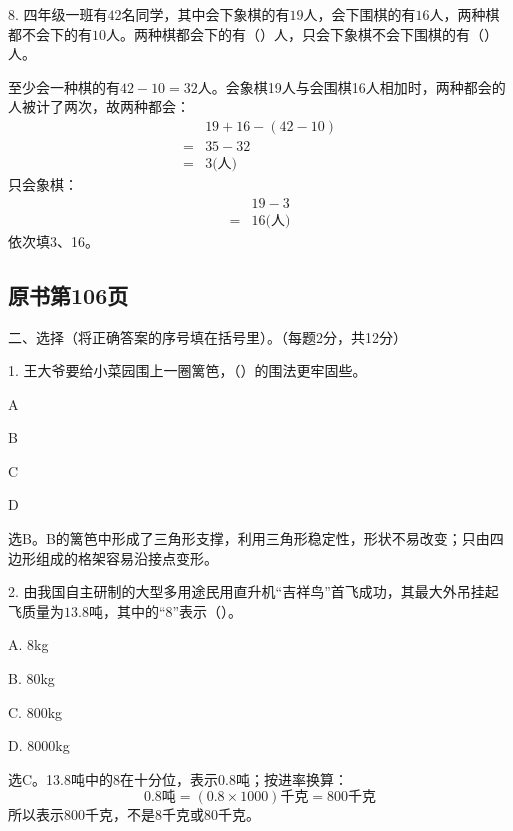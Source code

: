 8. 四年级一班有\(42\)名同学，其中会下象棋的有\(19\)人，会下围棋的有\(16\)人，两种棋都不会下的有\(10\)人。两种棋都会下的有（\hspace{1.8em}）人，只会下象棋不会下围棋的有（\hspace{1.8em}）人。\par
\begin{BookAnswer}
至少会一种棋的有\(42-10=32\)人。会象棋19人与会围棋16人相加时，两种都会的人被计了两次，故两种都会：\[\begin{aligned} &19+16-(42-10)\\ ={}&35-32\\ ={}&3\text{(人)}\end{aligned}\]只会象棋：\[\begin{aligned} &19-3\\ ={}&16\text{(人)}\end{aligned}\]依次填3、16。
\end{BookAnswer}



\subsection*{原书第106页}

二、选择（将正确答案的序号填在括号里）。（每题2分，共12分）\par 1. 王大爷要给小菜园围上一圈篱笆，（\hspace{1.8em}）的围法更牢固些。\par
\noindent A\par
\noindent B\par
\noindent C\par
\noindent D\par
{}
\begin{BookAnswer}
选B。B的篱笆中形成了三角形支撑，利用三角形稳定性，形状不易改变；只由四边形组成的格架容易沿接点变形。
\end{BookAnswer}

2. 由我国自主研制的大型多用途民用直升机“吉祥鸟”首飞成功，其最大外吊挂起飞质量为\(13.8\)吨，其中的“8”表示（\hspace{1.8em}）。\par
\noindent A. 8kg\par
\noindent B. 80kg\par
\noindent C. 800kg\par
\noindent D. 8000kg\par
\begin{BookAnswer}
选C。13.8吨中的8在十分位，表示\(0.8\)吨；按进率换算：\[0.8\text{吨}=(0.8\times1000)\text{千克}=800\text{千克}\]所以表示800千克，不是8千克或80千克。
\end{BookAnswer}

